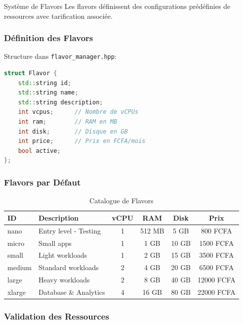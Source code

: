\documentclass[12pt,a4paper]{article}
\begin{document}
\begin{infobox}{Système de Flavors}
Les flavors définissent des configurations prédéfinies de ressources avec tarification associée.
\end{infobox}

\subsubsection{Définition des Flavors}

Structure dans \texttt{flavor\_manager.hpp}:

\begin{lstlisting}[language=C++, caption=Structure Flavor]
struct Flavor {
    std::string id;
    std::string name;
    std::string description;
    int vcpus;      // Nombre de vCPUs
    int ram;        // RAM en MB
    int disk;       // Disque en GB
    int price;      // Prix en FCFA/mois
    bool active;
};
\end{lstlisting}

\subsubsection{Flavors par Défaut}

\begin{table}[H]
\centering
\begin{tabularx}{\textwidth}{@{}lXcccc@{}}
\toprule
\textbf{ID} & \textbf{Description} & \textbf{vCPU} & \textbf{RAM} & \textbf{Disk} & \textbf{Prix} \\
\midrule
nano & Entry level - Testing & 1 & 512 MB & 5 GB & 800 FCFA \\
micro & Small apps & 1 & 1 GB & 10 GB & 1500 FCFA \\
small & Light workloads & 1 & 2 GB & 15 GB & 3500 FCFA \\
medium & Standard workloads & 2 & 4 GB & 20 GB & 6500 FCFA \\
large & Heavy workloads & 2 & 8 GB & 40 GB & 12000 FCFA \\
xlarge & Database \& Analytics & 4 & 16 GB & 80 GB & 22000 FCFA \\
\bottomrule
\end{tabularx}
\caption{Catalogue de Flavors}
\end{table}

\subsubsection{Validation des Ressources}
\end{document}
